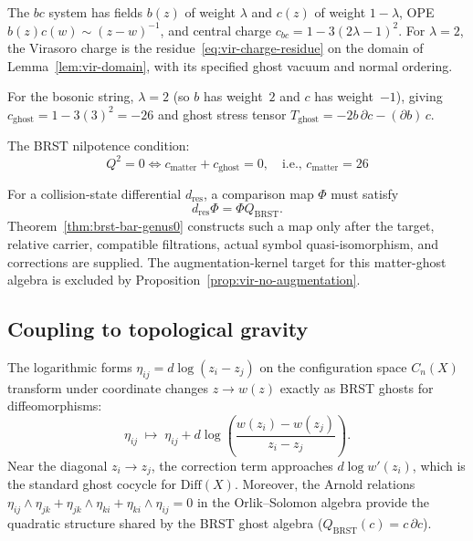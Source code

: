 \begin{example}
The $bc$ system has fields $b(z)$ of weight $\lambda$ and $c(z)$ of weight $1-\lambda$, OPE $b(z)c(w)\sim(z-w)^{-1}$, and central charge $c_{bc}=1-3(2\lambda-1)^2$.
For $\lambda=2$, the Virasoro charge is the residue~\eqref{eq:vir-charge-residue} on the domain of Lemma~\ref{lem:vir-domain}, with its specified ghost vacuum and normal ordering.

For the bosonic string, $\lambda = 2$ (so $b$ has weight~$2$ and $c$ has weight~$-1$), giving $c_{\text{ghost}} = 1 - 3(3)^2 = -26$ and ghost stress tensor $T_{\text{ghost}} = -2b\,\partial c - (\partial b)\,c$.

The BRST nilpotence condition:
\[Q^2 = 0 \iff c_{\text{matter}} + c_{\text{ghost}} = 0, \quad \text{i.e., } c_{\text{matter}} = 26\]

For a collision-state differential $d_{\mathrm{res}}$, a comparison map $\Phi$ must satisfy
\[d_{\mathrm{res}}\Phi=\Phi Q_{\mathrm{BRST}}.\]
Theorem~\ref{thm:brst-bar-genus0} constructs such a map only after the target, relative carrier, compatible filtrations, actual symbol quasi-isomorphism, and corrections are supplied.
The augmentation-kernel target for this matter-ghost algebra is excluded by Proposition~\ref{prop:vir-no-augmentation}.
\end{example}

\subsection{Coupling to topological gravity}

\begin{theorem}
\label{thm:log-form-ghost-law}
The logarithmic forms $\eta_{ij} = d\log(z_i - z_j)$
on the configuration space $C_n(X)$ transform under
coordinate changes $z \to w(z)$ exactly as BRST ghosts
for diffeomorphisms:
\[
\eta_{ij} \;\mapsto\; \eta_{ij}
+ d\log\!\left(\frac{w(z_i) - w(z_j)}{z_i - z_j}\right).
\]
Near the diagonal $z_i \to z_j$, the correction term
approaches $d\log w'(z_i)$, which is the standard ghost
cocycle for $\mathrm{Diff}(X)$.  Moreover, the Arnold
relations
$\eta_{ij} \wedge \eta_{jk} + \eta_{jk} \wedge \eta_{ki}
+ \eta_{ki} \wedge \eta_{ij} = 0$
in the Orlik--Solomon algebra provide the quadratic
structure shared by the BRST ghost algebra
($Q_{\mathrm{BRST}}(c) = c\,\partial c$).
\end{theorem}

